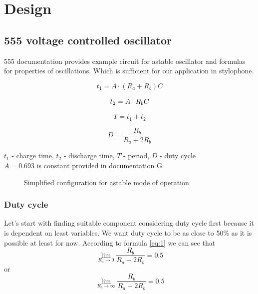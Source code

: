 \documentclass[english,10pt,a4paper]{article}
\begin{document}
	\section{Design}
	\subsection{555 voltage controlled oscillator}
	
	555 documentation provides example circuit for astable oscillator and formulas for properties of oscillations. Which is sufficient for our application in stylophone.
	
	\begin{equation}\label{eq:1}
		t_1 = A \cdot (R_a + R_b) C
	\end{equation}
	
	\begin{equation}\label{eq:2}
		t_2 = A \cdot R_b \space C
	\end{equation}
	
	\begin{equation}\label{eq:3}
		T = t_1 + t_2 
	\end{equation}
	
	\begin{equation}\label{eq:4}
		D = \dfrac{R_b}{R_a + 2R_b}
	\end{equation}
	
	$t_1$ - charge time, $t_2$ - discharge time, $T$ - period, $D$ - duty cycle \\
	$A = 0.693$ is constant provided in documentation
	G
	\begin{figure}[H]
		\centering
		
		\caption{Simplified configuration for astable mode of operation}
	\end{figure}
	
	\subsubsection{Duty cycle}
	Let's start with finding suitable component considering duty cycle first because it is dependent on least variables.
	We want duty cycle to be as close to 50\% as it is possible at least for now. According to formula \ref{eq:1} we can see that
	\begin{equation}
		\lim_{R_a \to 0} \dfrac{R_b}{R_a + 2R_b} = 0.5
	\end{equation}
	or
	\begin{equation}
		\lim_{R_b \to \infty} \dfrac{R_b}{R_a + 2R_b} = 0.5
	\end{equation}
	
\end{document}

